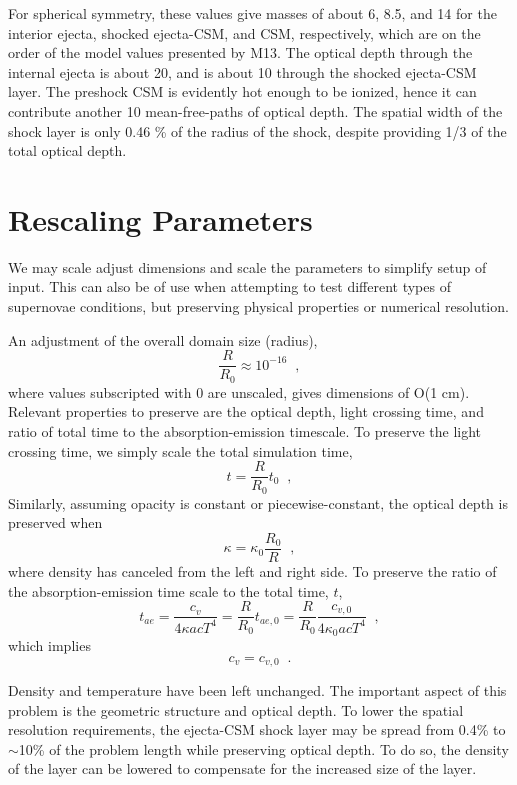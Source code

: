 \documentclass[11pt]{article}
\begin{document}
For spherical symmetry, these values give masses of about 6,
8.5, and 14 for the interior ejecta, shocked ejecta-CSM, and
CSM, respectively, which are on the order of the model values
presented by M13.
The optical depth through the internal ejecta is about 20, and
is about 10 through the shocked ejecta-CSM layer.
The preshock CSM is evidently hot enough to be ionized, hence
it can contribute another 10 mean-free-paths of optical depth.
The spatial width of the shock layer is only 0.46 \% of the
radius of the shock, despite providing 1/3 of the total optical
depth.

\section{Rescaling Parameters}
\label{sec:rescaling}

We may scale adjust dimensions and scale the parameters to
simplify setup of input.
This can also be of use when attempting to test different types
of supernovae conditions, but preserving physical properties or
numerical resolution.

An adjustment of the overall domain size (radius),
\begin{equation}
  \frac{R}{R_0} \approx 10^{-16} \;\;,
\end{equation}
where values subscripted with $0$ are unscaled, gives dimensions
of O(1 cm).
Relevant properties to preserve are the optical depth, light crossing
time, and ratio of total time to the absorption-emission timescale.
To preserve the light crossing time, we simply scale the total
simulation time,
\begin{equation}
  t = \frac{R}{R_0}t_0 \;\;,
\end{equation}
Similarly, assuming opacity is constant or piecewise-constant, the
optical depth is preserved when
\begin{equation}
  \kappa = \kappa_0\frac{R_0}{R} \;\;,
\end{equation}
where density has canceled from the left and right side.
To preserve the ratio of the absorption-emission time scale to
the total time, $t$,
\begin{equation}
  t_{ae} = \frac{c_v}{4\kappa acT^4} = \frac{R}{R_0}t_{ae,0}
  = \frac{R}{R_0}\frac{c_{v,0}}{4\kappa_0 acT^4} \;\;,
\end{equation}
which implies
\begin{equation}
  c_v = c_{v,0} \;\;.
\end{equation}

Density and temperature have been left unchanged.
The important aspect of this problem is the geometric structure
and optical depth.
To lower the spatial resolution requirements, the ejecta-CSM
shock layer may be spread from 0.4\% to $\sim$10\% of the problem
length while preserving optical depth.
To do so, the density of the layer can be lowered to compensate for
the increased size of the layer.
\end{document}
